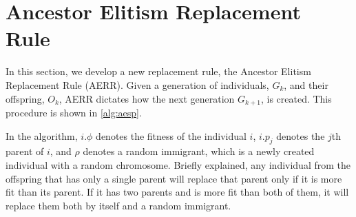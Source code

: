 \section{Ancestor Elitism Replacement Rule}
In this section, we develop a new replacement rule, the Ancestor Elitism Replacement Rule (AERR). Given a generation of individuals, $G_k$, and their offspring, $O_k$, AERR dictates how the next generation $G_{k+1}$, is created. This procedure is shown in \cref{alg:aesp}.
%

%
In the algorithm, $i.\phi$ denotes the fitness of the individual $i$, $i.p_j$ denotes the $j$th parent of $i$, and $\rho$ denotes a random immigrant, which is a newly created individual with a random chromosome.
Briefly explained, any individual from the offspring that has only a single parent will replace that parent only if it is more fit than its parent. If it has two parents and is more fit than both of them, it will replace them both by itself and a random immigrant.
